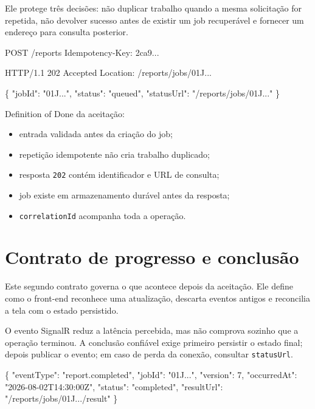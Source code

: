 \documentclass[
  10pt,
  a4paper,
  oneside]{book}
\newenvironment{Shaded}{}{}
\newcommand{\DataTypeTok}[1]{\textcolor[rgb]{0.56,0.13,0.00}{#1}}
\newcommand{\DecValTok}[1]{\textcolor[rgb]{0.25,0.63,0.44}{#1}}
\newcommand{\FunctionTok}[1]{\textcolor[rgb]{0.02,0.16,0.49}{#1}}
\newcommand{\NormalTok}[1]{#1}
\newcommand{\StringTok}[1]{\textcolor[rgb]{0.25,0.44,0.63}{#1}}
\providecommand{\tightlist}{%
  \setlength{\itemsep}{0pt}\setlength{\parskip}{0pt}}
\begin{document}
Ele protege três decisões: não duplicar trabalho quando a mesma
solicitação for repetida, não devolver sucesso antes de existir um job
recuperável e fornecer um endereço para consulta posterior.

\begin{Shaded}
\begin{Highlighting}[]
\NormalTok{POST /reports}
\NormalTok{Idempotency{-}Key: 2ca9...}

\NormalTok{HTTP/1.1 202 Accepted}
\NormalTok{Location: /reports/jobs/01J...}

\NormalTok{\{}
\NormalTok{  "jobId": "01J...",}
\NormalTok{  "status": "queued",}
\NormalTok{  "statusUrl": "/reports/jobs/01J..."}
\NormalTok{\}}
\end{Highlighting}
\end{Shaded}

Definition of Done da aceitação:

\begin{itemize}
\tightlist
\item
  entrada validada antes da criação do job;
\item
  repetição idempotente não cria trabalho duplicado;
\item
  resposta \texttt{202} contém identificador e URL de consulta;
\item
  job existe em armazenamento durável antes da resposta;
\item
  \texttt{correlationId} acompanha toda a operação.
\end{itemize}

\hypertarget{contrato-de-progresso-e-conclusuxe3o}{%
\section{Contrato de progresso e
conclusão}\label{contrato-de-progresso-e-conclusuxe3o}}

Este segundo contrato governa o que acontece depois da aceitação. Ele
define como o front-end reconhece uma atualização, descarta eventos
antigos e reconcilia a tela com o estado persistido.

O evento SignalR reduz a latência percebida, mas não comprova sozinho
que a operação terminou. A conclusão confiável exige primeiro persistir
o estado final; depois publicar o evento; em caso de perda da conexão,
consultar \texttt{statusUrl}.

\begin{Shaded}
\begin{Highlighting}[]
\FunctionTok{\{}
  \DataTypeTok{"eventType"}\FunctionTok{:} \StringTok{"report.completed"}\FunctionTok{,}
  \DataTypeTok{"jobId"}\FunctionTok{:} \StringTok{"01J..."}\FunctionTok{,}
  \DataTypeTok{"version"}\FunctionTok{:} \DecValTok{7}\FunctionTok{,}
  \DataTypeTok{"occurredAt"}\FunctionTok{:} \StringTok{"2026{-}08{-}02T14:30:00Z"}\FunctionTok{,}
  \DataTypeTok{"status"}\FunctionTok{:} \StringTok{"completed"}\FunctionTok{,}
  \DataTypeTok{"resultUrl"}\FunctionTok{:} \StringTok{"/reports/jobs/01J.../result"}
\FunctionTok{\}}
\end{Highlighting}
\end{Shaded}
\end{document}

